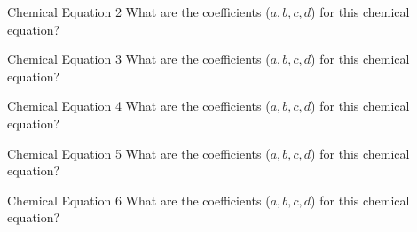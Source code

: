 \begin{example}[]{Chemical Equation 2}
  What are the coefficients ($a, b, c, d$) for this chemical equation? \\
  
  \tcblower
  
\end{example}

\begin{example}[]{Chemical Equation 3}
  What are the coefficients ($a, b, c, d$) for this chemical equation? \\
  
  \tcblower
  
\end{example}

\begin{example}[]{Chemical Equation 4}
  What are the coefficients ($a, b, c, d$) for this chemical equation? \\
  
  \tcblower
  
\end{example}

\begin{example}[]{Chemical Equation 5}
  What are the coefficients ($a, b, c, d$) for this chemical equation? \\
  
  \tcblower
  
\end{example}

\begin{example}[]{Chemical Equation 6}
  What are the coefficients ($a, b, c, d$) for this chemical equation? \\
  
  \tcblower
  
\end{example}